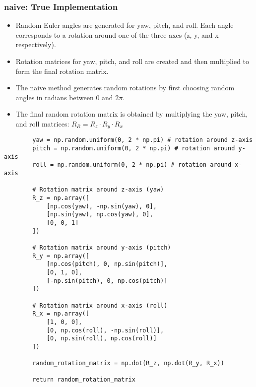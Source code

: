\documentclass[12pt, letterpaper]{article}
\begin{document}
\subsubsection{naive: True Implementation}
\begin{itemize}
    \item{Random Euler angles are generated for yaw, pitch, and roll. Each angle corresponds to a rotation around one of the three axes (z, y, and x respectively).}
    \item{Rotation matrices for yaw, pitch, and roll are created and then multiplied to form the final rotation matrix.}
    \item{The naive method generates random rotations by first choosing random angles in radians between $0$ and $2\pi$.}
    \item{The final random rotation matrix is obtained by multiplying the yaw, pitch, and roll matrices: $R_R = R_z \cdot R_y \cdot R_x$}
\end{itemize}
\begin{verbatim}
        yaw = np.random.uniform(0, 2 * np.pi) # rotation around z-axis
        pitch = np.random.uniform(0, 2 * np.pi) # rotation around y-axis
        roll = np.random.uniform(0, 2 * np.pi) # rotation around x-axis
        
        # Rotation matrix around z-axis (yaw)
        R_z = np.array([
            [np.cos(yaw), -np.sin(yaw), 0],
            [np.sin(yaw), np.cos(yaw), 0],
            [0, 0, 1]
        ])
        
        # Rotation matrix around y-axis (pitch)
        R_y = np.array([
            [np.cos(pitch), 0, np.sin(pitch)],
            [0, 1, 0],
            [-np.sin(pitch), 0, np.cos(pitch)]
        ])
        
        # Rotation matrix around x-axis (roll)
        R_x = np.array([
            [1, 0, 0],
            [0, np.cos(roll), -np.sin(roll)],
            [0, np.sin(roll), np.cos(roll)]
        ])
        
        random_rotation_matrix = np.dot(R_z, np.dot(R_y, R_x))

        return random_rotation_matrix
\end{verbatim}
\end{document}
